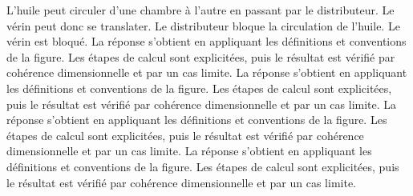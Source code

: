 \begin{corrigebox}
L'huile peut circuler d'une chambre à l'autre en passant par le distributeur. Le vérin peut donc se translater.
Le distributeur bloque la circulation de l'huile. Le vérin est bloqué.
La réponse s'obtient en appliquant les définitions et conventions de la
    figure. Les étapes de calcul sont explicitées, puis le résultat est vérifié par
    cohérence dimensionnelle et par un cas limite.
La réponse s'obtient en appliquant les définitions et conventions de la
    figure. Les étapes de calcul sont explicitées, puis le résultat est vérifié par
    cohérence dimensionnelle et par un cas limite.
La réponse s'obtient en appliquant les définitions et conventions de la
    figure. Les étapes de calcul sont explicitées, puis le résultat est vérifié par
    cohérence dimensionnelle et par un cas limite.
La réponse s'obtient en appliquant les définitions et conventions de la
    figure. Les étapes de calcul sont explicitées, puis le résultat est vérifié par
    cohérence dimensionnelle et par un cas limite.
\end{corrigebox}
